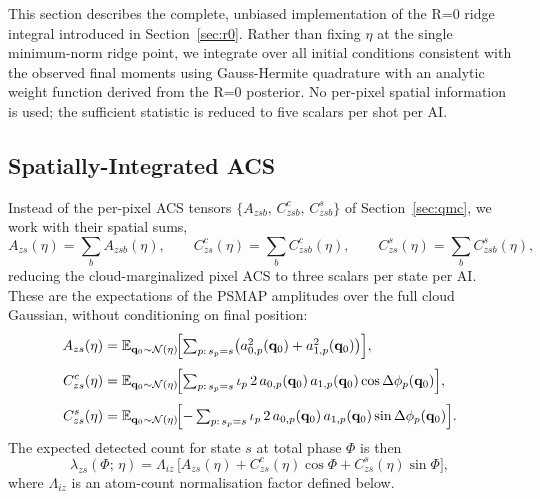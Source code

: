 \documentclass[11pt,a4paper]{article}
\newcommand{\E}{\mathbb{E}}
\newcommand{\q}{\mathbf{q}}
\begin{document}
This section describes the complete, unbiased implementation of the R=0 ridge
integral introduced in Section~\ref{sec:r0}.  Rather than fixing $\eta$ at the
single minimum-norm ridge point, we integrate over all initial conditions
consistent with the observed final moments using Gauss-Hermite quadrature with
an analytic weight function derived from the R=0 posterior.  No per-pixel
spatial information is used; the sufficient statistic is reduced to five scalars
per shot per AI.

\subsection{Spatially-Integrated ACS}
\label{sec:acs_integrated}

Instead of the per-pixel ACS tensors $\{A_{zsb},\,C^c_{zsb},\,C^s_{zsb}\}$ of
Section~\ref{sec:qmc}, we work with their spatial sums,
\begin{equation}
  A_{zs}(\eta) = \sum_b A_{zsb}(\eta),\qquad
  C^c_{zs}(\eta) = \sum_b C^c_{zsb}(\eta),\qquad
  C^s_{zs}(\eta) = \sum_b C^s_{zsb}(\eta),
  \label{eq:acs_int}
\end{equation}
reducing the cloud-marginalized pixel ACS to three scalars per state per AI.
These are the expectations of the PSMAP amplitudes over the full cloud
Gaussian, without conditioning on final position:
\begin{align}
  A_{zs}(\eta) &= \E_{\q_0 \sim \mathcal{N}(\eta)}
    \!\Bigl[\textstyle\sum_{p:\,s_p=s}
      \bigl(a_{0,p}^2(\q_0)+a_{1,p}^2(\q_0)\bigr)\Bigr],
  \label{eq:Aint}\\[3pt]
  C^c_{zs}(\eta) &= \E_{\q_0 \sim \mathcal{N}(\eta)}
    \!\Bigl[\textstyle\sum_{p:\,s_p=s}
      \iota_p\,2\,a_{0,p}(\q_0)\,a_{1,p}(\q_0)\cos\Delta\phi_p(\q_0)\Bigr],\\[3pt]
  C^s_{zs}(\eta) &= \E_{\q_0 \sim \mathcal{N}(\eta)}
    \!\Bigl[-\textstyle\sum_{p:\,s_p=s}
      \iota_p\,2\,a_{0,p}(\q_0)\,a_{1,p}(\q_0)\sin\Delta\phi_p(\q_0)\Bigr].
\end{align}
The expected detected count for state $s$ at total phase $\Phi$ is then
\begin{equation}
  \lambda_{zs}(\Phi;\,\eta)
  = \Lambda_{iz}\,\bigl[A_{zs}(\eta)+C^c_{zs}(\eta)\cos\Phi
    +C^s_{zs}(\eta)\sin\Phi\bigr],
  \label{eq:lambda_int}
\end{equation}
where $\Lambda_{iz}$ is an atom-count normalisation factor defined below.
\end{document}
